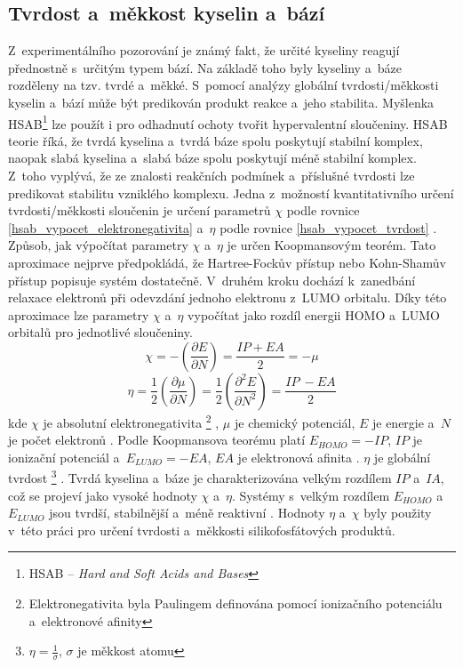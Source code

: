 \documentclass[
digital, %
table,   %
nolof,     %
nolot,     %
oneside,
]{fithesis3}
\begin{document}
\subsection{Tvrdost a~měkkost kyselin a~bází}
Z~experimentálního pozorování je známý fakt, že určité kyseliny reagují přednostně s~určitým typem bází. Na základě toho byly kyseliny a~báze rozděleny na tzv. tvrdé a~měkké. S~pomocí analýzy globální tvrdosti/měkkosti kyselin a~bází může být predikován produkt reakce a~jeho stabilita. Myšlenka HSAB\footnote{HSAB -- \textit{Hard and Soft Acids and Bases}} lze použít i pro odhadnutí ochoty tvořit hypervalentní sloučeniny. HSAB teorie říká, že tvrdá kyselina a~tvrdá báze spolu poskytují stabilní komplex, naopak slabá kyselina a~slabá báze spolu poskytují méně stabilní komplex. Z~toho vyplývá, že ze znalosti reakčních podmínek a~příslušné tvrdosti lze predikovat stabilitu vzniklého komplexu. Jedna z~možností kvantitativního určení tvrdosti/měkkosti sloučenin je určení parametrů $\chi$ podle rovnice \ref{hsab_vypocet_elektronegativita} a~$\eta$ podle rovnice \ref{hsab_vypocet_tvrdost} \cite{hsabclanek}. Způsob, jak výpočítat parametry $\chi$ a~$\eta$ je určen Koopmansovým teorém. Tato aproximace nejprve předpokládá, že Hartree-Fockův přístup nebo Kohn-Shamův přístup popisuje systém dostatečně. V~druhém kroku dochází k~zanedbání relaxace elektronů při odevzdání jednoho elektronu z~LUMO orbitalu. Díky této aproximace lze parametry $\chi$ a~$\eta$ vypočítat jako rozdíl energii HOMO a~LUMO orbitalů pro jednotlivé sloučeniny.
\begin{equation}
\chi = - \left( \frac{\partial E}{\partial N} \right) = \frac{IP + EA}{2} = -\mu
\label{hsab_vypocet_elektronegativita}
\end{equation}
\begin{equation}
\eta = \frac{1}{2} \left( \frac{\partial \mu}{\partial N} \right) = \frac{1}{2}\left( \frac{\partial^2 E}{\partial N^2} \right) = \frac{IP~- EA}{2}
\label{hsab_vypocet_tvrdost}
\end{equation}
kde $\chi$ je absolutní elektronegativita  \footnote{Elektronegativita byla Paulingem definována pomocí ionizačního potenciálu a~elektronové afinity} , $\mu$ je chemický potenciál, $E$ je energie a~$N$ je počet elektronů \cite{hsabwatoc}. Podle Koopmansova teorému platí $E_{HOMO} = - IP$, $IP$ je ionizační potenciál a~$E_{LUMO} = -EA$, $EA$ je elektronová afinita \cite{kratochvilexcerpta}. $\eta$ je globální tvrdost \footnote{$\eta = \frac{1}{\sigma}$, $\sigma$ je měkkost atomu} \cite{pearson1986absolute}. Tvrdá kyselina a~báze je charakterizována velkým rozdílem $IP$ a~$IA$, což se projeví jako vysoké hodnoty $\chi$ a~$\eta$. Systémy s~velkým rozdílem $E_{HOMO}$ a~$E_{LUMO}$ jsou tvrdší, stabilnější a~méně reaktivní \cite{hsabwatoc}. Hodnoty $\eta$ a~$\chi$ byly použity v~této práci pro určení tvrdosti a~měkkosti silikofosfátových produktů.\\
\end{document}
